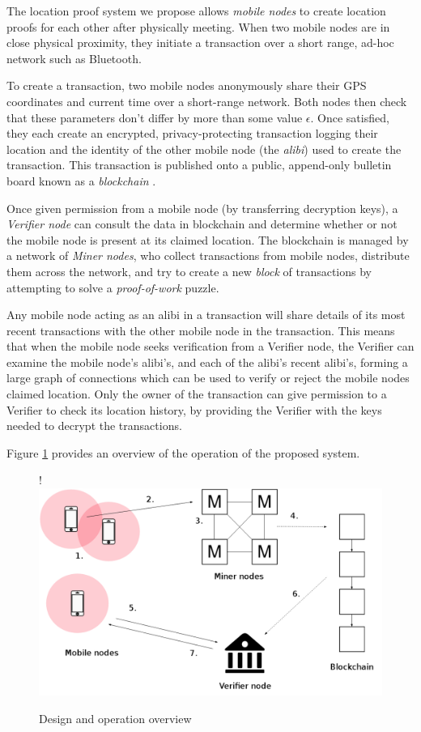 The location proof system we propose allows \textit{mobile nodes} to create location proofs for each other after physically meeting. When two mobile nodes are in close physical proximity, they initiate a transaction over a short range, ad-hoc network such as Bluetooth.

To create a transaction, two mobile nodes anonymously share their GPS coordinates and current time over a short-range network. Both nodes then check that these parameters don't differ by more than some value $\epsilon$. Once satisfied, they each create an encrypted, privacy-protecting transaction logging their location and the identity of the other mobile node (the \textit{alibi}) used to create the transaction. This transaction is published onto a public, append-only bulletin board known as a \textit{blockchain} \cite{blueprint}.

Once given permission from a mobile node (by transferring decryption keys), a \textit{Verifier node} can consult the data in blockchain and determine whether or not the mobile node is present at its claimed location. The blockchain is managed by a network of \textit{Miner nodes}, who collect transactions from mobile nodes, distribute them across the network, and try to create a new \textit{block} of transactions by attempting to solve a \textit{proof-of-work} puzzle.

Any mobile node acting as an alibi in a transaction will share details of its most recent transactions with the other mobile node in the transaction. This means that when the mobile node seeks verification from a Verifier node, the Verifier can examine the mobile node's alibi's, and each of the alibi's recent alibi's, forming a large graph of connections which can be used to verify or reject the mobile nodes claimed location. Only the owner of the transaction can give permission to a Verifier to check its location history, by providing the Verifier with the keys needed to decrypt the transactions.

Figure \ref{fig:overview} provides an overview of the operation of the proposed system.

\begin{figure}[H]
\begin{center}
\resizebox {\columnwidth} {!} {\includegraphics{diagrams/overview.png}}
\caption{Design and operation overview}
\label{fig:overview}
\end{center}
\end{figure}

